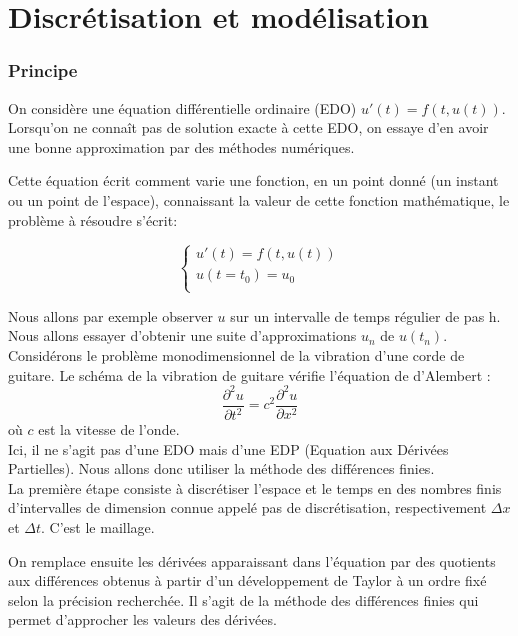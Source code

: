 \part{Discrétisation et modélisation}

\section{Principe}

On  considère  une  équation  différentielle  ordinaire  (EDO) $u'(t)=f(t,u(t))$. Lorsqu'on ne  connaît pas de solution exacte à cette EDO, on essaye d'en avoir une bonne approximation par  des méthodes numériques.

Cette équation écrit comment varie une fonction, en un point donné (un instant ou un point de l'espace), connaissant la valeur de cette fonction mathématique, le problème à résoudre s'écrit:

\begin{equation*}
\left \{
\begin{array}{rcl}
u'(t)=f(t,u(t))\\
u(t=t_0) = u_0 \\
\end{array}
\right.
\end{equation*}

Nous  allons par  exemple  observer  $u$  sur un intervalle de  temps
régulier de pas h. Nous  allons  essayer  d'obtenir  une suite  d'approximations  $u_n$  de
$u(t_n)$.\\

Considérons le problème monodimensionnel de la vibration d'une corde de guitare. Le schéma de la vibration de guitare vérifie l'équation de d'Alembert :
\begin{equation*}
\frac{\partial^2u}{\partial t^2} = c^{2}\frac{\partial^2u}{\partial x^2}
\end{equation*}
où $c$ est la vitesse de l'onde.\\

Ici, il ne s'agit pas d'une EDO mais d'une EDP (Equation aux Dérivées Partielles). Nous allons donc utiliser la méthode des différences finies.\\

La première étape consiste à discrétiser l'espace et le temps en des nombres finis d'intervalles de dimension connue appelé pas de discrétisation, respectivement $\Delta x$ et $\Delta t$. C'est le maillage.

On remplace ensuite les dérivées apparaissant dans l'équation par des quotients aux différences obtenus à partir d'un développement de Taylor à un ordre fixé selon la précision recherchée. Il s'agit de la méthode des différences finies qui permet d'approcher les valeurs des dérivées.\\

